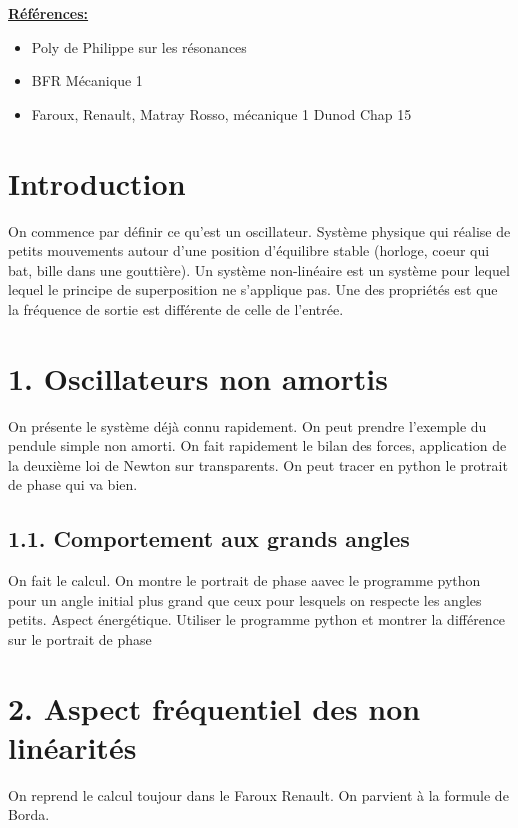 \documentclass[french, a4paper, 10pt, twocolumn, landscape]{article}
\begin{document}
\noindent\underline{\textbf{Références:}}

\begin{itemize}
    \item Poly de Philippe sur les résonances
    \item BFR Mécanique 1 
    \item Faroux, Renault, Matray Rosso, mécanique 1 Dunod Chap 15
\end{itemize}

\hrulefill


\section*{Introduction}

On commence par définir ce qu'est un oscillateur. Système physique qui réalise de petits mouvements autour d'une position d'équilibre stable (horloge, coeur qui bat, bille dans une gouttière). Un système non-linéaire est un système pour lequel lequel le principe de superposition ne s'applique pas. Une des propriétés est que la fréquence de sortie est différente de celle de l'entrée.

\section*{1. Oscillateurs non amortis}

On présente le système déjà connu rapidement. On peut prendre l'exemple du pendule simple non amorti. On fait rapidement le bilan des forces, application de la deuxième loi de Newton sur transparents. On peut tracer en python le protrait de phase qui va bien. 

\subsection*{1.1. Comportement aux grands angles}

On fait le calcul. On montre le portrait de phase aavec le programme python pour un angle initial plus grand que ceux pour lesquels on respecte les angles petits. Aspect énergétique. Utiliser le programme python et montrer la différence sur le portrait de phase

\section*{2. Aspect fréquentiel des non linéarités}

On reprend le calcul toujour dans le Faroux Renault. On parvient à la formule de Borda.
\end{document}
